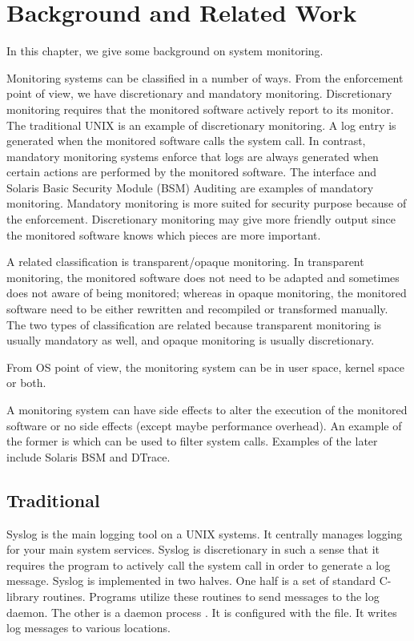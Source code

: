 \section{Background and Related Work}


In this chapter, we give some background on system monitoring.

Monitoring systems can be classified in a number of ways.
From the enforcement point of view, we have discretionary and
mandatory monitoring.
Discretionary monitoring requires that the monitored software
actively report to its monitor.
The traditional UNIX  is an example of discretionary monitoring.
A log entry is generated when the monitored software calls the 
system call.
In contrast, mandatory monitoring systems enforce that logs are always
generated when certain actions are performed by the monitored software.
The  interface and Solaris Basic Security Module (BSM) Auditing
are examples of mandatory monitoring.
Mandatory monitoring is more suited for security purpose because of the enforcement.
Discretionary monitoring may give more friendly output since the monitored
software knows which pieces are more important.

A related classification is transparent/opaque monitoring.
In transparent monitoring, the monitored software does not need to be adapted
and sometimes does not aware of being monitored;
whereas in opaque monitoring, the monitored software need to be either
rewritten and recompiled or transformed manually.
The two types of classification are related because transparent monitoring
is usually mandatory as well, and opaque monitoring is usually discretionary.

From OS point of view, the monitoring system can be in user space, kernel space
or both.

A monitoring system can have side effects to alter the execution of the
monitored software or no side effects (except maybe performance overhead).
An example of the former is  which can be used to filter
system calls.
Examples of the later include Solaris BSM and DTrace.

\subsection{Traditional }

Syslog is the main logging tool on a UNIX systems. It centrally manages logging
for your main system services. Syslog is discretionary in such a sense that it
requires the program to actively call the  system call in order to
generate a log message. Syslog is implemented in two halves. One half is a set
of standard C-library routines. Programs utilize these routines to send
messages to the log daemon. The other is a daemon process . It is
configured with the  file. It writes log messages to various
locations.

